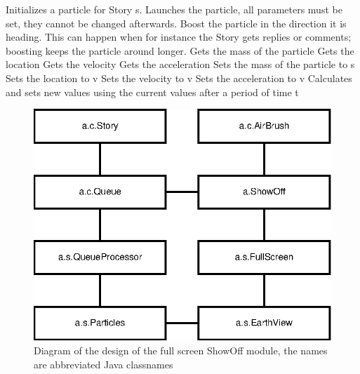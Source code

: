 \begin{interface}
    {Initializes a particle for Story s.}
    {Launches the particle, all parameters must be set, they cannot be changed
      afterwards.}
    {Boost the particle in the direction it is heading. This can happen when
      for instance the Story gets replies or comments; boosting keeps the
      particle around longer.}
    {Gets the mass of the particle}
    {Gets the location}
    {Gets the velocity}
    {Gets the acceleration}
    {Sets the mass of the particle to s}
    {Sets the location to v}
    {Sets the velocity to v}
    {Sets the acceleration to v}
    {Calculates and sets new values using the current values after a period of
      time t}
\end{interface}




\begin{classmetadata}
\end{classmetadata}

\begin{interface}
\end{interface}



\begin{figure}
  \centering
  \includegraphics{image/showoff-fullscreen}
  \caption{
    Diagram of the design of the full screen ShowOff module, the names are
    abbreviated Java classnames
  }
\end{figure}

